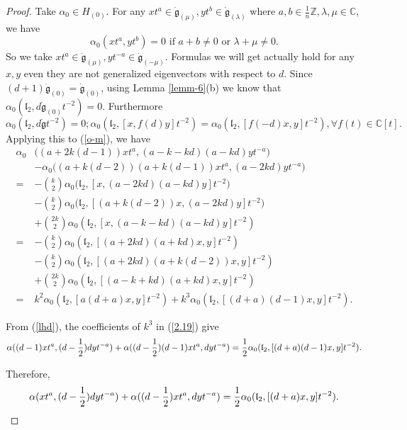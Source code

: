 \documentclass[10pt,a4paper]{amsart}
\def\bC{\mathbb{C}}
\def\bZ{\mathbb{Z}}
\def\dg{\dot{\mathfrak{g}}}
\def\fl{\mathfrak{l}}
\begin{document}
 \begin{proof} Take $\alpha_{0}\in H_{(0)}$. For any $xt^a\in \dg_{(\mu)},yt^{b}\in \dg_{(\lambda)}
 	$  where $a, b\in\frac 1n\bZ, \lambda,\mu\in\bC$, we have
 	$$\alpha_{0}(xt^a,yt^b)=0\text{ if }a+b\ne0\text{ or }\lambda+\mu\ne 0.$$
 	So we take  $xt^a\in \dg_{(\mu)},yt^{-a}\in \dg_{(-\mu)}$. Formulas we will get   actually hold for any $x, y$ even they are not generalized eigenvectors with respect to $d$. Since
 	$(d+1)\dg_{(0)}=\dg_{(0)}$,
 	using Lemma \ref{lemm-6}(b) we know   that $\alpha_{0}(\fl_2  ,d\dg_{(0)}t^{-2})=0$. Furthermore
 	\begin{equation}\label{d}
 		\alpha_{0}(\fl_2  ,d\dg t^{-2})=0; \alpha_0(\fl_2, [x,f(d)y]t^{-2})=\alpha_0(\fl_2,[f(-d)x,y]t^{-2}),\forall f(t)\in \bC[t].\end{equation}
 	Applying this to  (\ref{o-m}), we have
 \begin{equation}\label{2.19}\begin{aligned}\alpha_{0}&\big((a+2k(d-1))xt^a,(a-k-kd)(a-kd)yt^{-a}\big)\\ &-\alpha_{0}\big((a+k(d-2))(a+k(d-1))xt^a,(a-2kd)yt^{-a}\big)\\=&-\binom k2\alpha_{0}\big(\fl_{2},[x,(a-2kd)(a-kd)y]t^{-2}\big)\\
 		&-\binom k2\alpha_{0}\big(\fl_{2},[(a+k(d-2))x,(a-2kd)y]t^{-2}\big)\\&
+\binom {2k}2\alpha_{0}(\fl_{2},[x,(a-k-kd)(a-kd)y]t^{-2})\\
=&-\binom k2\alpha_{0}(\fl_{2},[(a+2kd)(a+kd)x,y]t^{-2})\\
 		&-\binom k2\alpha_{0}(\fl_{2},[(a+2kd)(a+k(d-2))x,y]t^{-2})\\&
+\binom {2k}2\alpha_{0}(\fl_{2},[(a-k+kd)(a+kd)x,y]t^{-2})\\
=&k^2\alpha_{0}(\fl_{2},[a(d+a)x,y]t^{-2})+k^3\alpha_{0}(\fl_{2},[(d+a)(d-1)x,y]t^{-2}).\end{aligned}\end{equation}




From (\ref{lhd}), the coefficients of $k^3$ in (\ref{2.19}) give
$$\alpha((d-1)xt^a, (d-\frac 12)dyt^{-a})+\alpha((d-\frac 12)(d-1)xt^a,dyt^{-a})\\
=\frac 12 \alpha_{0}(\fl_2,[(d+a)(d-1)x,y]t^{-2}).
$$

Therefore, $$\alpha(xt^a, (d-\frac 12)dyt^{-a})+\alpha((d-\frac 12)xt^a,dyt^{-a})\\
=\frac 12\alpha_{0}(\fl_2,[(d+a)x,y]t^{-2}).
$$



\end{proof}
\end{document}
